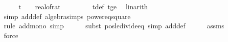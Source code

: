 \begin{isabellebody}
\ \isanewline
\ \ \isamarkupfalse%
\ {\isachardoublequoteopen}t\ {\isasymle}\ {}{}\ {\isacharslash}{\kern0pt}\ {\isacharparenleft}{\kern0pt}real{\isacharunderscore}{\kern0pt}of{\isacharunderscore}{\kern0pt}rat\ {\isasymdelta}{\isacharparenright}{\kern0pt}\ {\isacharplus}{\kern0pt}\ {}{\isachardoublequoteclose}\isanewline
\ \ \ \ \isamarkupfalse%
\ t{\isacharunderscore}{\kern0pt}def\ t{\isacharunderscore}{\kern0pt}ge{\isacharunderscore}{\kern0pt}{}\ \isamarkupfalse%
\ linarith\isanewline
\ \ \isamarkupfalse%
\ \isamarkupfalse%
\ {\isachardoublequoteopen}{\isachardot}{\kern0pt}{\isachardot}{\kern0pt}{\isachardot}{\kern0pt}\ {\isacharequal}{\kern0pt}\ {}{}\ {\isacharslash}{\kern0pt}\ {\isacharparenleft}{\kern0pt}{\isasymdelta}{\isacharprime}{\kern0pt}{\isacharparenright}{\kern0pt}\ {\isacharplus}{\kern0pt}\ {}{\isachardoublequoteclose}\isanewline
\ \ \ \ \isamarkupfalse%
\ {\isacharparenleft}{\kern0pt}simp\ add{\isacharcolon}{\kern0pt}{\isasymdelta}{\isacharprime}{\kern0pt}{\isacharunderscore}{\kern0pt}def\ algebra{\isacharunderscore}{\kern0pt}simps\ power{}{\isacharunderscore}{\kern0pt}eq{\isacharunderscore}{\kern0pt}square{\isacharparenright}{\kern0pt}\isanewline
\ \ \isamarkupfalse%
\ \isamarkupfalse%
\ {\isachardoublequoteopen}{\isachardot}{\kern0pt}{\isachardot}{\kern0pt}{\isachardot}{\kern0pt}\ {\isasymle}\ {}{}\ {\isacharslash}{\kern0pt}\ {\isasymdelta}{\isacharprime}{\kern0pt}\ {\isacharplus}{\kern0pt}\ {}\ {\isacharslash}{\kern0pt}\ {\isasymdelta}{\isacharprime}{\kern0pt}\isanewline
\ \ \ \ \isamarkupfalse%
\ {\isacharparenleft}{\kern0pt}rule\ add{\isacharunderscore}{\kern0pt}mono{\isacharcomma}{\kern0pt}\ simp{\isacharparenright}{\kern0pt}\isanewline
\ \ \ \ \isamarkupfalse%
\ {\isacharparenleft}{\kern0pt}subst\ pos{\isacharunderscore}{\kern0pt}le{\isacharunderscore}{\kern0pt}divide{\isacharunderscore}{\kern0pt}eq{\isacharcomma}{\kern0pt}\ simp\ add{\isacharcolon}{\kern0pt}{\isasymdelta}{\isacharprime}{\kern0pt}{\isacharunderscore}{\kern0pt}def{\isacharparenright}{\kern0pt}\isanewline
\ \ \ \ \isamarkupfalse%
\ assms\ \isamarkupfalse%
\ force\isanewline
\ \ \ \ \isamarkupfalse%

\end{isabellebody}
